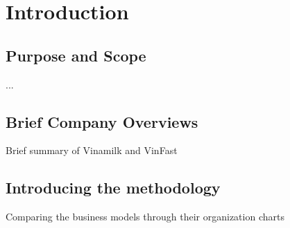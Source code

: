 \chapter{Introduction}
\label{chap:introduction}

\section{Purpose and Scope}

...

\section{Brief Company Overviews}

Brief summary of Vinamilk and VinFast

\section{Introducing the methodology}

Comparing the business models through their organization charts

